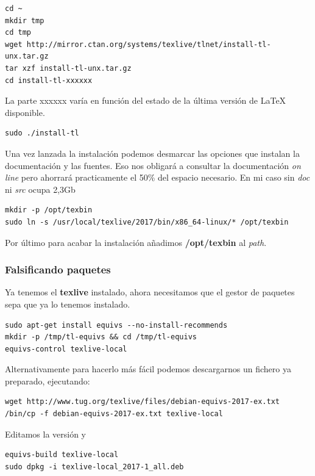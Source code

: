 \documentclass[12pt,spanish,]{scrartcl}
\begin{document}
\begin{verbatim}
cd ~
mkdir tmp
cd tmp
wget http://mirror.ctan.org/systems/texlive/tlnet/install-tl-unx.tar.gz
tar xzf install-tl-unx.tar.gz
cd install-tl-xxxxxx
\end{verbatim}

La parte xxxxxx varía en función del estado de la última versión de
LaTeX disponible.

\begin{verbatim}
sudo ./install-tl
\end{verbatim}

Una vez lanzada la instalación podemos desmarcar las opciones que
instalan la documentación y las fuentes. Eso nos obligará a consultar la
documentación \emph{on line} pero ahorrará practicamente el 50\% del
espacio necesario. En mi caso sin \emph{doc} ni \emph{src} ocupa 2,3Gb

\begin{verbatim}
mkdir -p /opt/texbin
sudo ln -s /usr/local/texlive/2017/bin/x86_64-linux/* /opt/texbin
\end{verbatim}

Por último para acabar la instalación añadimos \textbf{/opt/texbin} al
\emph{path}.

\hypertarget{falsificando-paquetes}{%
\subsubsection{Falsificando paquetes}\label{falsificando-paquetes}}

Ya tenemos el \textbf{texlive} instalado, ahora necesitamos que el
gestor de paquetes sepa que ya lo tenemos instalado.

\begin{verbatim}
sudo apt-get install equivs --no-install-recommends
mkdir -p /tmp/tl-equivs && cd /tmp/tl-equivs
equivs-control texlive-local
\end{verbatim}

Alternativamente para hacerlo más fácil podemos descargarnos un fichero
ya preparado, ejecutando:

\begin{verbatim}
wget http://www.tug.org/texlive/files/debian-equivs-2017-ex.txt
/bin/cp -f debian-equivs-2017-ex.txt texlive-local
\end{verbatim}

Editamos la versión y

\begin{verbatim}
equivs-build texlive-local
sudo dpkg -i texlive-local_2017-1_all.deb
\end{verbatim}
\end{document}
